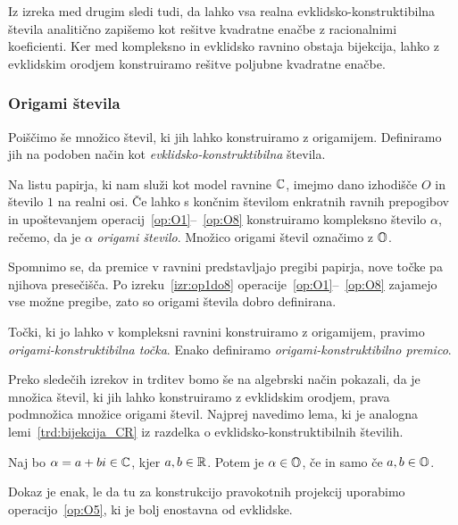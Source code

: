 Iz izreka med drugim sledi tudi, da lahko vsa realna evklidsko-konstruktibilna števila analitično zapišemo kot rešitve kvadratne enačbe z racionalnimi koeficienti. Ker med kompleksno in evklidsko ravnino obstaja bijekcija, lahko z evklidskim orodjem konstruiramo rešitve poljubne kvadratne enačbe.

\subsubsection{Origami števila}
\label{origami_konstruktibilnost}

Poiščimo še množico števil, ki jih lahko konstruiramo z origamijem. Definiramo jih na podoben način kot \emph{evklidsko-konstruktibilna} števila.

\begin{definicija}
    \label{def:origami_stevilo}
    Na listu papirja, ki nam služi kot model ravnine $\mathbb C$, imejmo dano izhodišče $O$ in število $1$ na realni osi. Če lahko s končnim številom enkratnih ravnih prepogibov in upoštevanjem operacij~\ref{op:O1}--~\ref{op:O8} konstruiramo kompleksno število $\alpha$, rečemo, da je $\alpha$ \emph{origami število}. Množico origami števil označimo z $\mathbb O$.
\end{definicija}

Spomnimo se, da premice v ravnini predstavljajo pregibi papirja, nove točke pa njihova presečišča. Po izreku~\ref{izr:op1do8} operacije~\ref{op:O1}--~\ref{op:O8} zajamejo vse možne pregibe, zato so origami števila dobro definirana.

\begin{definicija}
    Točki, ki jo lahko v kompleksni ravnini konstruiramo z origamijem, pravimo \emph{origami-konstruktibilna točka}. Enako definiramo \emph{origami-konstruktibilno premico}.
\end{definicija}

Preko sledečih izrekov in trditev bomo še na algebrski način pokazali, da je množica števil, ki jih lahko konstruiramo z evklidskim orodjem, prava podmnožica množice origami števil. Najprej navedimo lema, ki je analogna lemi~\ref{trd:bijekcija_CR} iz razdelka o evklidsko-konstruktibilnih številih.

\begin{lema}
    \label{trd:zaprt_koord}
    Naj bo $\alpha = a + bi \in \mathbb C$, kjer $a, b \in \mathbb R$. Potem je $\alpha \in \mathbb O$, če in samo če $a, b \in \mathbb O$.
\end{lema}
Dokaz je enak, le da tu za konstrukcijo pravokotnih projekcij uporabimo operacijo~\ref{op:O5}, ki je bolj enostavna od evklidske.

